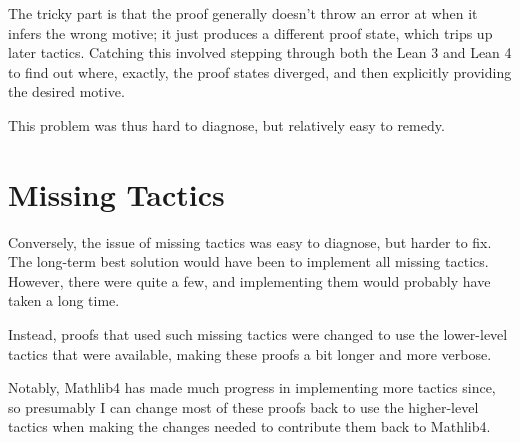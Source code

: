 The tricky part is that the proof generally doesn't throw an error at  when it
infers the wrong motive; it just produces a different proof state, which trips up later tactics.
Catching this involved stepping through both the Lean 3 and Lean 4 to find out where, exactly, the proof states
diverged, and then explicitly providing the desired motive.

This problem was thus hard to diagnose, but relatively easy to remedy.


\section{Missing Tactics} 
Conversely, the issue of missing tactics was easy to diagnose, but harder to fix.
The long-term best solution would have been to implement all missing tactics.
However, there were quite a few, and implementing them would probably have taken a long time.

Instead, proofs that used such missing tactics were changed to use the lower-level tactics that were
available, making these proofs a bit longer and more verbose.

Notably, Mathlib4 has made much progress in implementing more tactics since, 
so presumably I can change most of these proofs back to use the higher-level tactics when
making the changes needed to contribute them back to Mathlib4.




